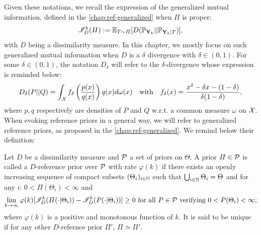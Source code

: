 Given these notations, we recall the expression of the generalized mutual information, defined in the \cref{chap:ref-generalized} when $\varPi$ is proper:
\begin{equation}
    \mathscr{I}_D^k(\varPi) := \mathbb{E}_{T\sim\varPi}[D(\mathbb{P}_{\mathbf{Y}_k}||\mathbb{P}_{\mathbf{Y}_k|T} )],
\end{equation}
with $D$ being a dissimilarity measure.
In this chapter, we mostly focus on such generalized mutual information when $D$ is a $\delta$ divergence with $\delta\in(0,1)$. For some $\delta\in(0,1)$, the notation $D_\delta$ will refer to the $\delta$-divergence whose expression is reminded below:
    \begin{equation}
        D_\delta(P||Q) = \int_{\mathcal{X}} f_\delta\left( \frac{p(x)}{q(x)}  \right) q(x) d\omega(x)\quad \text{with}\quad f_\delta(x) = \frac{x^\delta-\delta x-(1-\delta)}{\delta(1-\delta)},
    \end{equation}
where $p,q$ respectively are densities of $P$ and $Q$ w.r.t. a common measure $\omega$ on $\mathcal{X}$.
When evoking reference priors in a general way, we will refer to generalized reference priors, as proposed in the \cref{chap:ref-generalized}.
We remind below their definition:
\begin{defi}\label{def:BA:genref}
    Let $D$ be a dissimilarity measure and $\mathcal{P}$ a set of priors on $\Theta$. A prior $\varPi\in\mathcal{P}$ is called a $D$-reference prior over $\mathcal{P}$ with rate $\varphi(k)$ if there exists an openly increasing  sequence of compact subsets $(\Theta_i)_{i\in\mathbb{N}}$
    such that $\bigcup_{i\in\mathbb{N}}\Theta_i=\Theta$ and for any $i$: $0<\varPi(\Theta_i)<\infty $ and
        \begin{equation} %
            \lim_{k\rightarrow\infty}\varphi(k)[\sI^k_D(\varPi(\cdot|\Theta_i))-\sI^k_D(P(\cdot|\Theta_i))] \geq0 \text{\ for all\ } P\in\cP\text{\ verifying\ }0<P(\Theta_i)<\infty;
        \end{equation}
    where  $\varphi(k)$ is a {positive and}  monotonous function of $k$. It is said to be unique if for any other $D$-refernce prior $\varPi'$, $\varPi\simeq\varPi'$.
\end{defi}


